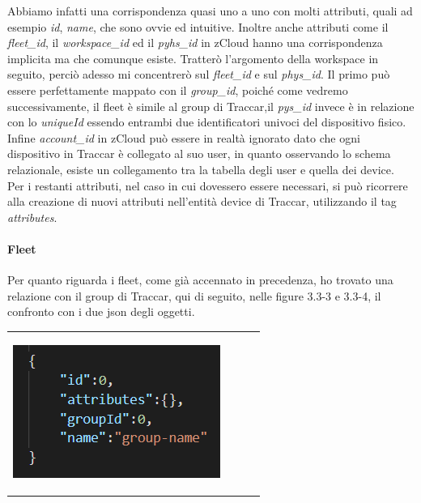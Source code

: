 \documentclass[a4paper,titlepage,12pt]{book}
\begin{document}
{Abbiamo infatti una corrispondenza quasi uno a uno con molti attributi, quali ad esempio \textit{id}, \textit{name}, che sono ovvie ed intuitive. Inoltre anche attributi come il \textit{fleet\_id}, il \textit{workspace\_id} ed il \textit{pyhs\_id} in zCloud hanno una corrispondenza implicita ma che comunque esiste. Tratterò l'argomento della workspace in seguito,  perciò adesso mi concentrerò sul \textit{fleet\_id} e sul \textit{phys\_id}. Il primo può essere perfettamente mappato con il \textit{group\_id}, poiché come vedremo successivamente, il fleet è simile al group di Traccar,il \textit{pys\_id} invece è in relazione con lo \textit{uniqueId} essendo entrambi due identificatori univoci del dispositivo fisico. Infine \textit{account\_id} in zCloud può essere in realtà ignorato dato che ogni dispositivo in Traccar è collegato al suo user, in quanto osservando lo schema relazionale, esiste un collegamento tra la tabella degli user e quella dei device.\\
Per i restanti attributi, nel caso in cui dovessero essere necessari, si può ricorrere alla creazione di nuovi attributi nell'entità device di Traccar, utilizzando il tag \textit{attributes}.

\paragraph{
Fleet}
Per quanto riguarda i fleet, come già accennato in precedenza, ho trovato una relazione con il group di Traccar, qui di seguito, nelle figure 3.3-3 e 3.3-4, il confronto con i due json degli oggetti.




\begin{center}

\begin{tabular}{c c c c}

    \includegraphics[scale=0.8]{images/traccGr.png}

    \label{fig:my_label}


\end{tabular}
\end{center}}
\end{document}
